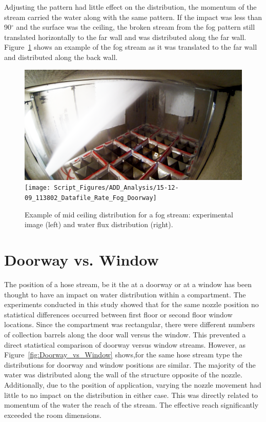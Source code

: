 \documentclass[12pt,oneside]{book}
\begin{document}
Adjusting the pattern had little effect on the distribution, the momentum of the stream carried the water along with the same pattern. If the impact was less than 90$^{\circ}$ and the surface was the ceiling, the broken stream from the fog pattern still translated horizontally to the far wall and was distributed along the far wall. Figure~\ref{fig:Doorway_Fog_MidCeiling} shows an example of the fog stream as it was translated to the far wall and distributed along the back wall.

\begin{figure}[!ht]
\centering
\includegraphics[height=0.25\textwidth]{Figures/Water_Distribution/Nozzle_Directions/Interior_MidCeiling_Fog}
\texttt{[image: Script\_Figures/ADD\_Analysis/15-12-09\_113802\_Datafile\_Rate\_Fog\_Doorway]}
\caption[Example of Mid Ceiling Distribution]{Example of mid ceiling distribution for a fog stream: experimental image (left) and water flux distribution (right).}
\label{fig:Doorway_Fog_MidCeiling}
\end{figure}

\section{Doorway vs. Window}
The position of a hose stream, be it the at a doorway or at a window has been thought to have an impact on water distribution within a compartment. The experiments conducted in this study showed that for the same nozzle position no statistical differences occurred between first floor or second floor window locations. Since the compartment was rectangular, there were different numbers of collection barrels along the door wall versus the window. This prevented a direct statistical comparison of doorway versus window streams. However, as Figure~\ref{fig:Doorway_vs_Window} shows,for the same hose stream type the distributions for doorway and window positions are similar. The majority of the water was distributed along the wall of the structure opposite of the nozzle. Additionally, due to the position of application, varying the nozzle movement had little to no impact on the distribution in either case. This was directly related to momentum of the water the reach of the stream. The effective reach significantly exceeded the room dimensions.
\end{document}
